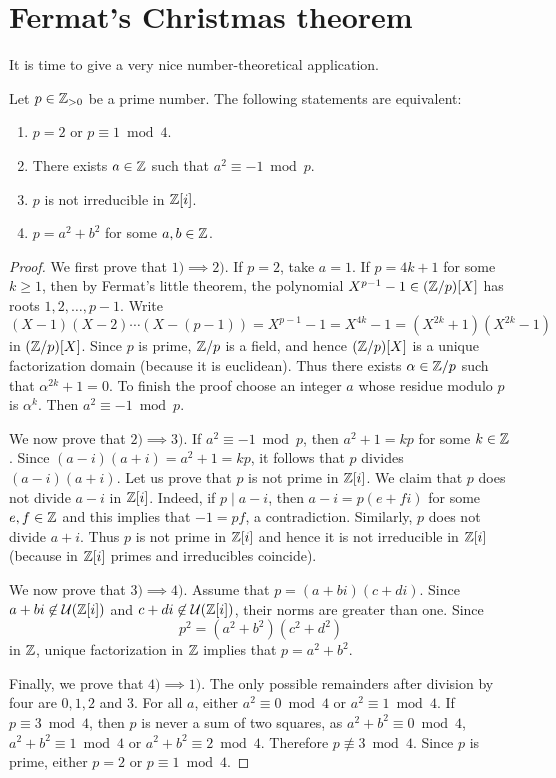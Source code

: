 \section{Fermat's Christmas theorem}
\lecture\label{lec:Fermat}

It is time to give a very nice number-theoretical application.

\begin{theorem}[Fermat]
\label{thm:Fermat}
	Let $p\in\mathbb{Z}_{>0}$ be a prime number. The following statements are equivalent:
	\begin{enumerate}
	    \item $p=2$ or $p\equiv1\bmod 4$.
	    \item There exists $a\in\mathbb{Z}$ such that $a^2\equiv-1\bmod p$.
	    \item $p$ is not irreducible in $\mathbb{Z}[i]$.
	    \item $p=a^2+b^2$ for some $a,b\in\mathbb{Z}$.
	\end{enumerate}
\end{theorem}

\begin{proof}
    We first prove that $1)\implies 2)$. If $p=2$, take $a=1$. If $p=4k+1$ for
    some $k\geq1$, then by Fermat's little theorem, the polynomial 
    $X^{p-1}-1\in(\mathbb{Z}/p)[X]$ has roots $1,2,\dots,p-1$. Write
    \[
    (X-1)(X-2)\cdots (X-(p-1))=X^{p-1}-1=X^{4k}-1=(X^{2k}+1)(X^{2k}-1)
    \]
    in $(\mathbb{Z}/p)[X]$. Since $p$ is prime, $\mathbb{Z}/p$ is a field, and hence
    $(\mathbb{Z}/p)[X]$ is a unique factorization domain (because it is euclidean).
    Thus there exists $\alpha\in\mathbb{Z}/p$ such that $\alpha^{2k}+1=0$. To finish
    the proof choose an integer $a$ whose residue modulo $p$ is $\alpha^k$.
    Then $a^2\equiv-1\bmod p$.
    
    We now prove that $2)\implies 3)$. If $a^2\equiv-1\bmod p$, then $a^2+1=kp$ 
    for some $k\in\mathbb{Z}$. Since $(a-i)(a+i)=a^2+1=kp$, it follows that
    $p$ divides $(a-i)(a+i)$. Let us prove that $p$ is not prime in $\mathbb{Z}[i]$. 
    We claim that $p$ does not divide $a-i$ in $\mathbb{Z}[i]$. Indeed, if $p\mid a-i$, then
    $a-i=p(e+fi)$ for some $e,f\in\mathbb{Z}$ and this implies that $-1=pf$, a contradiction. Similarly,
    $p$ does not divide $a+i$. Thus $p$ is not prime in $\mathbb{Z}[i]$ 
    and hence it is not irreducible in $\mathbb{Z}[i]$ (because in $\mathbb{Z}[i]$ primes and irreducibles coincide). 
    
    We now prove that $3)\implies 4)$. Assume that $p=(a+bi)(c+di)$.  Since
    $a+bi\not\in\mathcal{U}(\mathbb{Z}[i])$ and $c+di\not\in\mathcal{U}(\mathbb{Z}[i])$, their
    norms are greater than one.  Since 
    \[
    p^2=(a^2+b^2)(c^2+d^2)
    \]
    in $\mathbb{Z}$, unique factorization in $\mathbb{Z}$ implies that $p=a^2+b^2$. 
    
    Finally, we prove that $4)\implies 1)$. 
    The only possible remainders after division by four are $0,1,2$ and $3$.  
    For all $a$, either $a^2\equiv 0\bmod 4$ or $a^2\equiv 1\bmod 4$. 
    If $p\equiv3\bmod 4$, then $p$ is never a sum of two squares, as 
    $a^2+b^2\equiv 0\bmod 4$, $a^2+b^2\equiv 1\bmod 4$ or $a^2+b^2\equiv 2\bmod 4$. 
    Therefore $p\not\equiv3\bmod4$. Since $p$ is prime, either
    $p=2$ or $p\equiv1\bmod4$.
\end{proof}

